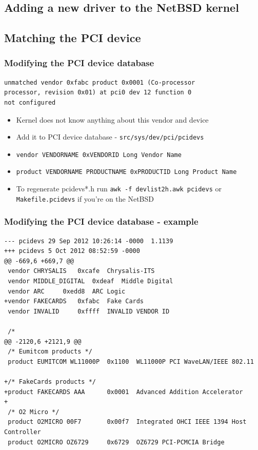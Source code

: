 \documentclass[dvipsnames,table]{beamer}
\begin{document}
\subsection{Adding a new driver to the NetBSD kernel}

\subsection{Matching the PCI device}

\begin{frame}[fragile]
\frametitle{Modifying the PCI device database}
\begin{verbatim}
unmatched vendor 0xfabc product 0x0001 (Co-processor 
processor, revision 0x01) at pci0 dev 12 function 0 
not configured
\end{verbatim}
\begin{itemize}
	\item Kernel does not know anything about this vendor and device
	\item Add it to PCI device database - {\tt src/sys/dev/pci/pcidevs}
	\item {\tt vendor VENDORNAME 0xVENDORID Long Vendor Name}
	\item {\tt product VENDORNAME PRODUCTNAME 0xPRODUCTID	Long Product Name}
	\item To regenerate pcidevs*.h run {\tt awk -f devlist2h.awk pcidevs} or
{\tt Makefile.pcidevs} if you're on the NetBSD
\end{itemize}
\end{frame}

\begin{frame}[fragile]
\frametitle{Modifying the PCI device database - example}
\scriptsize
\begin{verbatim}
--- pcidevs	29 Sep 2012 10:26:14 -0000	1.1139
+++ pcidevs	5 Oct 2012 08:52:59 -0000
@@ -669,6 +669,7 @@
 vendor CHRYSALIS	0xcafe	Chrysalis-ITS
 vendor MIDDLE_DIGITAL	0xdeaf	Middle Digital
 vendor ARC		0xedd8	ARC Logic
+vendor FAKECARDS	0xfabc	Fake Cards
 vendor INVALID		0xffff	INVALID VENDOR ID
 
 /*
@@ -2120,6 +2121,9 @@
 /* Eumitcom products */
 product EUMITCOM WL11000P	0x1100	WL11000P PCI WaveLAN/IEEE 802.11
 
+/* FakeCards products */
+product FAKECARDS AAA		0x0001	Advanced Addition Accelerator
+
 /* O2 Micro */
 product O2MICRO 00F7		0x00f7	Integrated OHCI IEEE 1394 Host Controller
 product O2MICRO OZ6729		0x6729	OZ6729 PCI-PCMCIA Bridge
\end{verbatim}
\end{frame}
\end{document}
